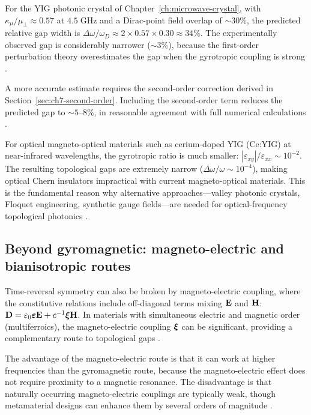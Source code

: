 For the YIG photonic crystal of Chapter~\ref{ch:microwave-crystal},
with $\kappa_\mu/\mu_\perp \approx 0.57$ at $4.5\;\mathrm{GHz}$ and
a Dirac-point field overlap of $\sim 30\%$, the predicted relative
gap width is $\Delta\omega/\omega_D \approx 2\times 0.57\times 0.30
\approx 34\%$.  The experimentally observed gap is considerably
narrower ($\sim 3\%$), because the first-order perturbation theory
overestimates the gap when the gyrotropic coupling is strong
\cite{zhao2020first}.

A more accurate estimate requires the second-order correction
derived in Section~\ref{sec:ch7-second-order}.  Including the
second-order term reduces the predicted gap to $\sim 5$--$8\%$,
in reasonable agreement with full numerical calculations
\cite{gangaraj2016berry}.

For optical magneto-optical materials such as cerium-doped YIG
(Ce:YIG) at near-infrared wavelengths, the gyrotropic ratio is
much smaller: $|\varepsilon_{xy}|/\varepsilon_{xx} \sim 10^{-2}$.
The resulting topological gaps are extremely narrow
($\Delta\omega/\omega \sim 10^{-4}$), making optical Chern
insulators impractical with current magneto-optical materials.
This is the fundamental reason why alternative approaches---valley
photonic crystals, Floquet engineering, synthetic gauge fields---are
needed for optical-frequency topological photonics
\cite{ozawa2018topological,price2022roadmap}.

\subsection{Beyond gyromagnetic: magneto-electric and bianisotropic routes}
\label{sec:ch7-beyond-gyromagnetic}

Time-reversal symmetry can also be broken by magneto-electric
coupling, where the constitutive relations include off-diagonal
terms mixing $\mathbf{E}$ and $\mathbf{H}$:
$\mathbf{D} = \varepsilon_0\boldsymbol{\varepsilon}\mathbf{E} + c^{-1}\boldsymbol{\xi}\mathbf{H}$.
In materials with simultaneous electric and magnetic order
(multiferroics), the magneto-electric coupling $\boldsymbol{\xi}$ can be
significant, providing a complementary route to topological gaps
\cite{khanikaev2013photonic,slobozhanyuk2015observation}.

The advantage of the magneto-electric route is that it can work at
higher frequencies than the gyromagnetic route, because the
magneto-electric effect does not require proximity to a magnetic
resonance.  The disadvantage is that naturally occurring
magneto-electric couplings are typically weak, though metamaterial
designs can enhance them by several orders of magnitude
\cite{slobozhanyuk2015observation,price2022roadmap}.


